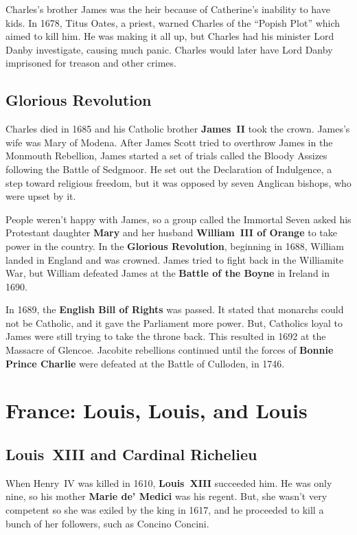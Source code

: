 Charles's brother James was the heir because of Catherine's inability to have kids.
In 1678, Titus Oates, a priest, warned Charles of the ``Popish Plot'' which aimed to kill him.
He was making it all up, but Charles had his minister Lord Danby investigate, causing much panic.
Charles would later have Lord Danby imprisoned for treason and other crimes.

\subsection*{Glorious Revolution}

Charles died in 1685 and his Catholic brother \textbf{James~II} took the crown.
James's wife was Mary of Modena.
After James Scott tried to overthrow James in the Monmouth Rebellion,
James started a set of trials called the Bloody Assizes following the Battle of Sedgmoor.
He set out the Declaration of Indulgence, a step toward religious freedom,
but it was opposed by seven Anglican bishops, who were upset by it.

People weren't happy with James,
so a group called the Immortal Seven asked his Protestant daughter
\textbf{Mary} and her husband \textbf{William~III of Orange} to take power in the country.
In the \textbf{Glorious Revolution}, beginning in 1688, William landed in England and was crowned.
James tried to fight back in the Williamite War,
but William defeated James at the \textbf{Battle of the Boyne} in Ireland in 1690.

In 1689, the \textbf{English Bill of Rights} was passed.
It stated that monarchs could not be Catholic, and it gave the Parliament more power.
But, Catholics loyal to James were still trying to take the throne back.
This resulted in 1692 at the Massacre of Glencoe.
Jacobite rebellions continued until the forces of
\textbf{Bonnie Prince Charlie} were defeated at the Battle of Culloden, in 1746.

\section{France: Louis, Louis, and Louis}

\subsection*{Louis~XIII and Cardinal Richelieu}

When Henry~IV was killed in 1610, \textbf{Louis~XIII} succeeded him.
He was only nine, so his mother \textbf{Marie de' Medici} was his regent.
But, she wasn't very competent so she was exiled by the king in 1617,
and he proceeded to kill a bunch of her followers, such as Concino Concini.

